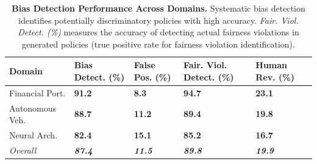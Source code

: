 \documentclass[sigconf,natbib]{acmart}
\renewcommand{\arraystretch}{1.1} %
\renewcommand{\arraystretch}{1.1} %
\newcommand{\tablesize}{\footnotesize} %
\newcommand{\tablenumfmt}[1]{\textbf{#1}} %
\newcommand{\tableheader}[1]{\textbf{#1}} %
\newcommand{\compacttable}{\setlength{\arraystretch}{1.0}\setlength{\tabcolsep}{4pt}} %
\newcommand{\resettable}{\setlength{\arraystretch}{1.1}\setlength{\tabcolsep}{5pt}} %
\begin{document}
\begin{table}[htbp]
  \centering
  \caption{\textbf{Bias Detection Performance Across Domains.} Systematic bias detection identifies potentially discriminatory policies with high accuracy. \textit{Fair. Viol. Detect. (\%)} measures the accuracy of detecting actual fairness violations in generated policies (true positive rate for fairness violation identification).}
  \label{tab:bias_detection_performance}
  \compacttable\tablesize
  \begin{tabular}{@{}l>{\centering\arraybackslash}p{1.1cm}>{\centering\arraybackslash}p{1.1cm}>{\centering\arraybackslash}p{1.2cm}>{\centering\arraybackslash}p{1.1cm}@{}}
    \toprule
    \tableheader{Domain} & \tableheader{Bias Detect. (\%)} & \tableheader{False Pos. (\%)} & \tableheader{Fair. Viol. Detect. (\%)} & \tableheader{Human Rev. (\%)} \\
    \midrule
    Financial Port.    & \tablenumfmt{91.2} & \tablenumfmt{8.3}  & \tablenumfmt{94.7} & \tablenumfmt{23.1} \\
    Autonomous Veh.     & \tablenumfmt{88.7} & \tablenumfmt{11.2} & \tablenumfmt{89.4} & \tablenumfmt{19.8} \\
    Neural Arch.    & \tablenumfmt{82.4} & \tablenumfmt{15.1} & \tablenumfmt{85.2} & \tablenumfmt{16.7} \\
    \midrule
    \textit{Overall} & \textit{\tablenumfmt{87.4}} & \textit{\tablenumfmt{11.5}} & \textit{\tablenumfmt{89.8}} & \textit{\tablenumfmt{19.9}} \\
    \bottomrule
  \end{tabular}
  \resettable
\end{table}
\end{document}
